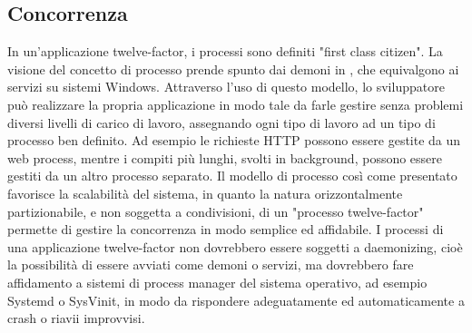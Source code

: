 \documentclass[NormeDiProgetto.tex]{subfiles}
\begin{document}
\subsection{Concorrenza}
In un'applicazione twelve-factor, i processi sono definiti "first class citizen". La visione del concetto di processo prende spunto dai demoni in , che equivalgono ai servizi su sistemi Windows.
Attraverso l'uso di questo modello, lo sviluppatore può realizzare la propria applicazione in modo tale da farle gestire senza problemi diversi livelli di carico di lavoro, assegnando ogni tipo di lavoro ad un tipo di processo ben definito.
Ad esempio le richieste HTTP possono essere gestite da un web process, mentre i compiti più lunghi, svolti in background, possono essere gestiti da un altro processo separato.
Il modello di processo così come presentato favorisce la scalabilità del sistema, in quanto la natura orizzontalmente partizionabile, e non soggetta a condivisioni, di un "processo twelve-factor" permette di gestire la concorrenza in modo semplice ed affidabile. 
I processi di una applicazione twelve-factor non dovrebbero essere soggetti a daemonizing, cioè la possibilità di essere avviati come demoni o servizi, ma dovrebbero fare affidamento a sistemi di process manager del sistema operativo, ad esempio Systemd o SysVinit, in modo da rispondere adeguatamente ed automaticamente a crash o riavii improvvisi.
\end{document}
